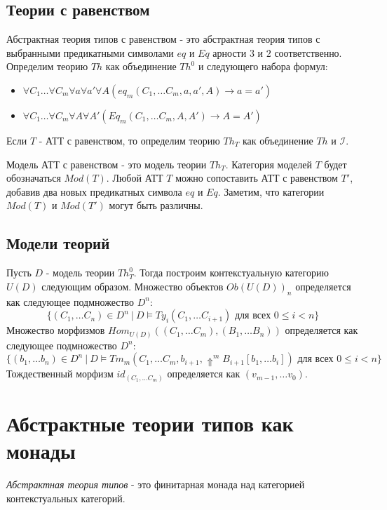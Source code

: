\documentclass{amsart}
\theoremstyle{definition}
\theoremstyle{remark}
\numberwithin{figure}{section}
\begin{document}
\subsection{Теории с равенством}

Абстрактная теория типов с равенством - это абстрактная теория типов с выбранными предикатными символами $eq$ и $Eq$ арности $3$ и $2$ соответственно.
Определим теорию $Th$ как объединение $Th^0$ и следующего набора формул:
\begin{itemize}
\item $\forall C_1 \ldots \forall C_m \forall a \forall a' \forall A (eq_m(C_1, \ldots C_m, a, a', A) \to a = a')$
\item $\forall C_1 \ldots \forall C_m \forall A \forall A' (Eq_m(C_1, \ldots C_m, A, A') \to A = A')$
\end{itemize}
Если $T$ - АТТ с равенством, то определим теорию $Th_T$ как объединение $Th$ и $\mathcal{I}$.

Модель АТТ с равенством - это модель теории $Th_T$.
Категория моделей $T$ будет обозначаться $Mod(T)$.
Любой АТТ $T$ можно сопоставить АТТ с равенством $T'$, добавив два новых предикатных символа $eq$ и $Eq$.
Заметим, что категории $Mod(T)$ и $Mod(T')$ могут быть различны.

\subsection{Модели теорий}

Пусть $D$ - модель теории $Th^0_T$.
Тогда построим контекстуальную категорию $U(D)$ следующим образом.
Множество объектов $Ob(U(D))_n$ определяется как следующее подмножество $D^n$:
\[ \{ (C_1, \ldots C_n) \in D^n\ |\ D \models Ty_i(C_1, \ldots C_{i + 1}) \text{ для всех } 0 \leq i < n \} \]
Множество морфизмов $Hom_{U(D)}((C_1, \ldots C_m), (B_1, \ldots B_n))$ определяется как следующее подмножество $D^n$:
\[ \{ (b_1, \ldots b_n) \in D^n\ |\ D \models Tm_m(C_1, \ldots C_m, b_{i + 1}, \Uparrow^m B_{i + 1}[b_1, \ldots b_i]) \text{ для всех } 0 \leq i < n \} \]
Тождественный морфизм $id_{(C_1, \ldots C_m)}$ определяется как $(v_{m - 1}, \ldots v_0)$.

\section{Абстрактные теории типов как монады}

\begin{defn}
\emph{Абстрактная теория типов} - это финитарная монада над категорией контекстуальных категорий.
\end{defn}
\end{document}
